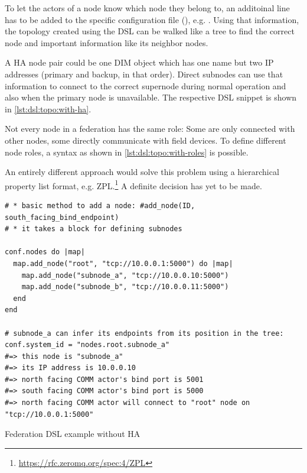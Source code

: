 To let the actors of a node know which node they belong to, an additoinal line
has to be added to the specific configuration file (), e.g.
. Using that information, the topology
created using the DSL can be walked like a tree to find the correct node and
important information like its neighbor nodes.

A HA node pair could be one DIM object which has one name but two IP addresses
(primary and backup, in that order). Direct subnodes can use that information
to connect to the correct supernode during normal operation and also
when the primary node is unavailable. The respective DSL snippet is shown in
\autoref{lst:dsl:topo:with-ha}.

Not every node in a federation has the same role: Some are only connected with other
nodes, some directly communicate with field devices. To define different node roles, a
syntax as shown in \autoref{lst:dsl:topo:with-roles} is possible.

An entirely different approach would solve this problem using a hierarchical
property list format, e.g. ZPL.\footnote{\url{https://rfc.zeromq.org/spec:4/ZPL}}
A definite decision has yet to be made.

\begin{listing}
	\begin{verbatim}
# * basic method to add a node: #add_node(ID, south_facing_bind_endpoint)
# * it takes a block for defining subnodes

conf.nodes do |map|
  map.add_node("root", "tcp://10.0.0.1:5000") do |map|
    map.add_node("subnode_a", "tcp://10.0.0.10:5000")
    map.add_node("subnode_b", "tcp://10.0.0.11:5000")
  end
end

# subnode_a can infer its endpoints from its position in the tree:
conf.system_id = "nodes.root.subnode_a"
#=> this node is "subnode_a"
#=> its IP address is 10.0.0.10
#=> north facing COMM actor's bind port is 5001
#=> south facing COMM actor's bind port is 5000
#=> north facing COMM actor will connect to "root" node on "tcp://10.0.0.1:5000"
	\end{verbatim}
	\caption{Federation DSL example without HA}
	\label{lst:dsl:topo:no-ha}
\end{listing}

